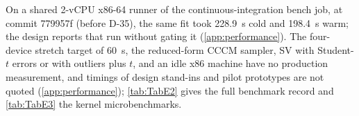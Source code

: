 On a shared 2-vCPU x86-64 runner of the continuous-integration bench job, at commit 779957f (before D-35), the same fit took 228.9~s cold and 198.4~s warm; the design reports that run without gating it (\cref{app:performance}). %
The four-device stretch target of 60~s, the reduced-form CCCM sampler, SV with Student-$t$ errors or with outliers plus $t$, and an idle x86 machine have no production measurement, and timings of design stand-ins and pilot prototypes are not quoted (\cref{app:performance}); \cref{tab:TabE2} gives the full benchmark record and \cref{tab:TabE3} the kernel microbenchmarks. %
